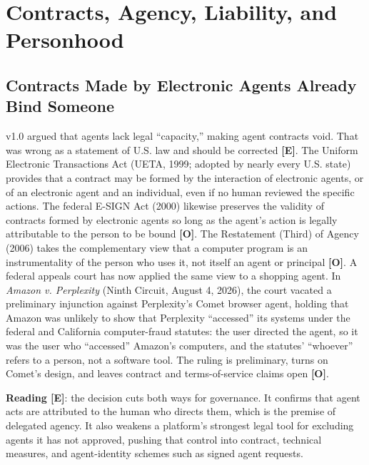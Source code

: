 \documentclass[11pt,letterpaper]{article}
\begin{document}
\section{Contracts, Agency, Liability, and Personhood}
\label{sec:legal}

\subsection{Contracts Made by Electronic Agents Already Bind Someone}

v1.0 argued that agents lack legal ``capacity,'' making agent contracts void. That was wrong as a statement of U.S. law and should be corrected \textbf{[E]}. The Uniform Electronic Transactions Act (UETA, 1999; adopted by nearly every U.S. state) provides that a contract may be formed by the interaction of electronic agents, or of an electronic agent and an individual, even if no human reviewed the specific actions. The federal E-SIGN Act (2000) likewise preserves the validity of contracts formed by electronic agents so long as the agent's action is legally attributable to the person to be bound \textbf{[O]}. The Restatement (Third) of Agency (2006) takes the complementary view that a computer program is an instrumentality of the person who uses it, not itself an agent or principal \textbf{[O]}. A federal appeals court has now applied the same view to a shopping agent. In \textit{Amazon v. Perplexity} (Ninth Circuit, August 4, 2026), the court vacated a preliminary injunction against Perplexity's Comet browser agent, holding that Amazon was unlikely to show that Perplexity ``accessed'' its systems under the federal and California computer-fraud statutes: the user directed the agent, so it was the user who ``accessed'' Amazon's computers, and the statutes' ``whoever'' refers to a person, not a software tool. The ruling is preliminary, turns on Comet's design, and leaves contract and terms-of-service claims open \textbf{[O]}.

\textbf{Reading [E]}: the decision cuts both ways for governance. It confirms that agent acts are attributed to the human who directs them, which is the premise of delegated agency. It also weakens a platform's strongest legal tool for excluding agents it has not approved, pushing that control into contract, technical measures, and agent-identity schemes such as signed agent requests.
\end{document}

